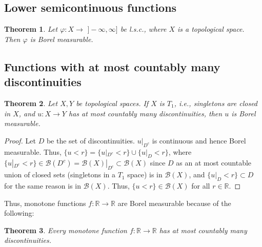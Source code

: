 \documentclass[11pt, a4paper, openany]{book}
\newtheorem{thm}{Theorem}\newtheorem{lem}{Lemma}\newtheorem{crl}{Corollary}
\theoremstyle{definition}
\begin{document}
\subsection{Lower semicontinuous functions}
    \begin{thm}
        Let $\varphi:X\rightarrow \,\,]\!-\!\infty,\infty]$ be l.s.c., where $X$ is a topological space. Then $\varphi$ is Borel measurable.
    \end{thm}
\subsection{Functions with at most countably many discontinuities}
    \begin{thm}
        Let $X,Y$ be topological spaces. If $X$ is $T_1$, i.e., singletons are closed in $X$, and $u:X\rightarrow Y$ has at most countably many discontinuities, then $u$ is Borel measurable.
    \end{thm}
    \begin{proof}
        Let $D$ be the set of discontinuities. $u|_{D^c}$ is continuous and hence Borel measurable. Thus, $\{u<r\}=\{u|_{D^c}<r\}\cup \{u|_D<r\}$, where $\{u|_{D^c}<r\}\in\mathscr{B}(D^c)=\mathscr{B}(X)|_{D^c}\subset \mathscr{B}(X)$ since $D$ as an at most countable union of closed sets (singletons in a $T_1$ space) is in $\mathscr{B}(X)$, and $\{u|_D<r\}\subset D$ for the same reason is in $\mathscr{B}(X)$. Thus, $\{u<r\}\in\mathscr{B}(X)$ for all $r\in\mathbb{R}$.
    \end{proof}
    Thus, monotone functions $f:\mathbb{R}\rightarrow\mathbb{R}$ are Borel measurable because of the following:
    \begin{thm}
        Every monotone function $f:\mathbb{R}\rightarrow\mathbb{R}$ has at most countably many discontinuities.
    \end{thm}
\end{document}
